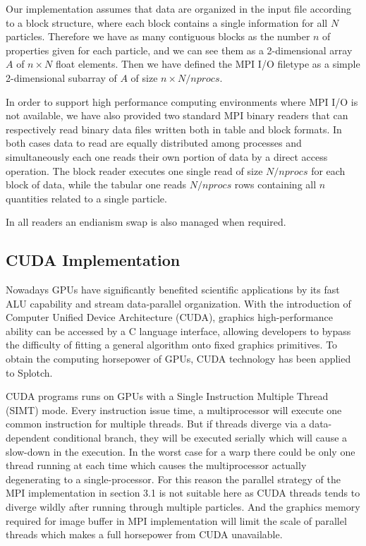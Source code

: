 Our implementation assumes that data are organized in the input file according to a block structure, 
where each block contains a single information for all $N$ particles. Therefore we have as many contiguous blocks
as the number $n$ of properties given for each particle, and we can see them as a 2-dimensional array $A$ 
of $n \times N$ float elements. 
Then we have defined the MPI I/O filetype as a simple 2-dimensional subarray of $A$ 
of size $n \times N/nprocs$.  
 
In order to support high performance computing environments where MPI I/O is not available, 
we have also provided two standard MPI binary readers that can respectively 
read binary data files written both in table and block formats. 
In both cases data to read are equally distributed among processes and simultaneously each one reads  
their own portion of data by a direct access operation. 
The block reader executes one single read of size $N/nprocs$ for each block of data, 
while the tabular one reads $N/nprocs$ rows containing all $n$ quantities related to a single particle.

In all readers an endianism swap is also managed when required.   



\subsection{CUDA Implementation}
\label{cuda}
Nowadays GPUs have significantly benefited scientific applications by its fast ALU 
capability and stream data-parallel organization. With the introduction of
 Computer Unified Device Architecture (CUDA), graphics high-performance 
 ability can be accessed by a C language interface, allowing developers to bypass 
 the difficulty of fitting a general algorithm onto fixed graphics primitives. 
To obtain the computing horsepower of GPUs, CUDA technology has been applied
to Splotch.

CUDA programs runs on GPUs with a Single Instruction Multiple Thread (SIMT)
mode. Every instruction issue time, a multiprocessor will execute one common instruction 
for multiple threads. But if threads diverge via a data-dependent 
conditional branch, they will be executed serially which will cause a 
slow-down in the execution. In the worst case for a warp \cite{cuda} there could 
be only one thread running at each time which causes the multiprocessor
 actually degenerating to a single-processor. For this reason the parallel strategy of 
 the MPI implementation in section 3.1 is not suitable here as CUDA threads tends to 
 diverge wildly after running through multiple particles. And the graphics memory 
required for image buffer in MPI implementation will limit the scale 
of parallel threads which makes a full horsepower from CUDA unavailable.

